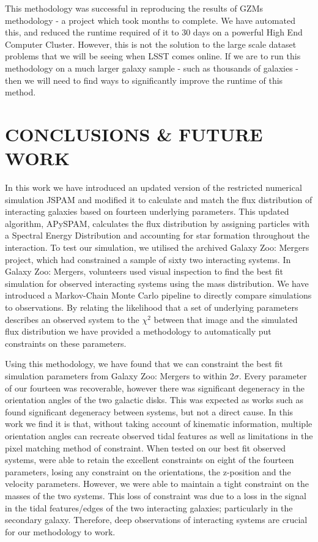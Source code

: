 This methodology was successful in reproducing the results of GZMs methodology - a project which took months to complete. We have automated this, and reduced the runtime required of it to 30 days on a powerful High End Computer Cluster. However, this is not the solution to the large scale dataset problems that we will be seeing when LSST comes online. If we are to run this methodology on a much larger galaxy sample - such as thousands of galaxies - then we will need to find ways to significantly improve the runtime of this method.

\section{CONCLUSIONS \& FUTURE WORK}\label{Conclusions}
\noindent In this work we have introduced an updated version of the restricted numerical simulation JSPAM and modified it to calculate and match the flux distribution of interacting galaxies based on fourteen underlying parameters. This updated algorithm, APySPAM, calculates the flux distribution by assigning particles with a Spectral Energy Distribution and accounting for star formation throughout the interaction. To test our simulation, we utilised the archived Galaxy Zoo: Mergers project, which had constrained a sample of sixty two interacting systems. In Galaxy Zoo: Mergers, volunteers used visual inspection to find the best fit simulation for observed interacting systems using the mass distribution. We have introduced a Markov-Chain Monte Carlo pipeline to directly compare simulations to observations. By relating the likelihood that a set of underlying parameters describes an observed system to the $\chi^{2}$ between that image and the simulated flux distribution we have provided a methodology to automatically put constraints on these parameters.

Using this methodology, we have found that we can constraint the best fit simulation parameters from Galaxy Zoo: Mergers to within 2$\sigma$. Every parameter of our fourteen was recoverable, however there was significant degeneracy in the orientation angles of the two galactic disks. This was expected as works such as \citet{Smith_10} found significant degeneracy between systems, but not a direct cause. In this work we find it is that, without taking account of kinematic information, multiple orientation angles can recreate observed tidal features as well as limitations in the pixel matching method of constraint. When tested on our best fit observed systems, were able to retain the excellent constraints on eight of the fourteen parameters, losing any constraint on the orientations, the z-position and the velocity parameters. However, we were able to maintain a tight constraint on the masses of the two systems. This loss of constraint was due to a loss in the signal in the tidal features/edges of the two interacting galaxies; particularly in the secondary galaxy. Therefore, deep observations of interacting systems are crucial for our methodology to work. 

